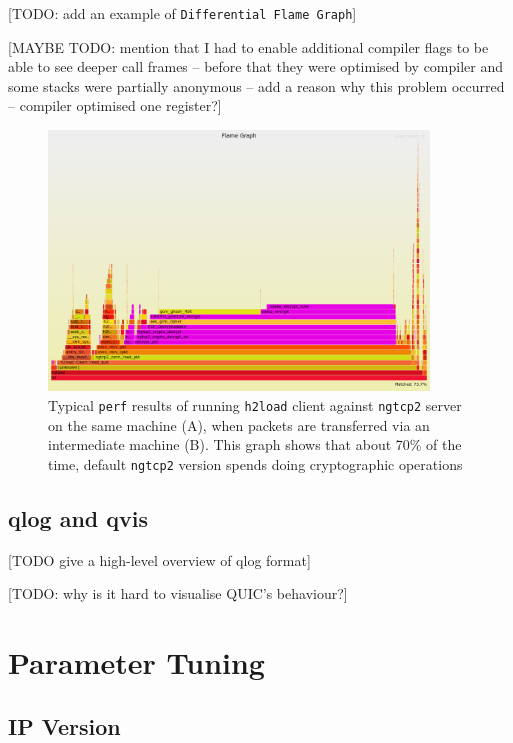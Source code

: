 \documentclass[12pt,a4paper,twoside,openright]{report}
\begin{document}
[TODO: add an example of \texttt{Differential Flame Graph}]





[MAYBE TODO: mention that I had to enable additional compiler flags to be able to see deeper call frames -- before that they were optimised by compiler and some stacks were partially anonymous  -- add a reason why this problem occurred -- compiler optimised one register?]

    \begin{figure}[ht]
    \centering
    \includegraphics[width=0.9\textwidth]{figs/perf_results_of_h2load.png}
    \caption{Typical \texttt{perf} results of running \texttt{h2load} client against \texttt{ngtcp2} server on the same machine (A), when packets are transferred via an intermediate machine (B). This graph shows that about 70\% of the time, default \texttt{ngtcp2} version spends doing cryptographic operations} 
    \label{fig:perf_results_of_h2load}
    \end{figure}
    
\subsection{qlog and qvis}
[TODO give a high-level overview of qlog format]

[TODO: why is it hard to visualise QUIC's behaviour?]



\section{Parameter Tuning}

\subsection{IP Version}
\end{document}
